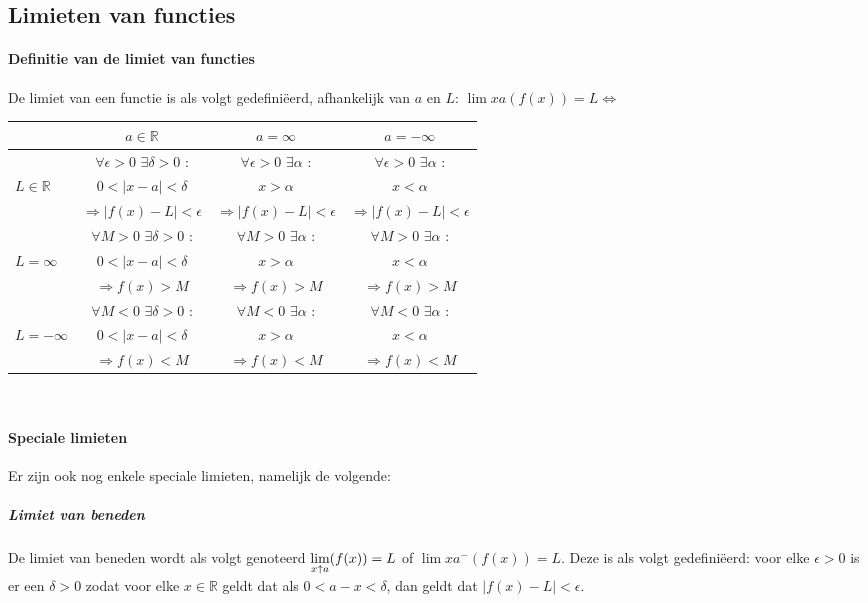 \subsection{Limieten van functies}
\paragraph{Definitie van de limiet van functies} De limiet van een functie is als volgt gedefiniëerd, afhankelijk van $a$ en $L$: $\lim{x}{a}(f(x))=L \Leftrightarrow$

\begin{tabular}{|l|c|c|c|}\hline
		& $a \in \mathbb{R}$ & $a = \infty$ & $a = -\infty$ \\ \hline
		& $\forall \epsilon > 0$ $\exists \delta > 0 $ : & $\forall \epsilon > 0$ $\exists \alpha$ : & $\forall \epsilon > 0$ $\exists \alpha$ :  \\
		$L \in \mathbb{R}$& $0<|x-a|<\delta$ & $x>\alpha$ & $x<\alpha$\\
		& $ \Rightarrow|f(x) - L|<\epsilon$ & $\Rightarrow|f(x) - L|<\epsilon$ & $\Rightarrow|f(x) - L|<\epsilon$ \\ \hline
		& $\forall M>0$ $\exists \delta > 0$ : & $\forall M>0$ $\exists \alpha$ : & $\forall M>0$ $\exists \alpha$ : \\
		$L = \infty$ & $0<|x-a|<\delta$ & $x > \alpha$ & $x < \alpha$ \\
		& $\Rightarrow f(x) > M$ & $\Rightarrow f(x) > M$ & $\Rightarrow f(x) > M$ \\ \hline
		& $\forall M<0$ $\exists \delta > 0$ : & $\forall M<0$ $\exists \alpha$ : & $\forall M<0$ $\exists \alpha$ : \\
		$L = -\infty$ & $0<|x-a|<\delta$ & $x > \alpha$ & $x < \alpha$ \\
		& $\Rightarrow f(x) < M$ & $\Rightarrow f(x) < M$ & $\Rightarrow f(x) < M$ \\\hline
	\end{tabular}\\

\paragraph{Speciale limieten} Er zijn ook nog enkele speciale limieten, namelijk de volgende:

\subparagraph{Limiet van beneden} De limiet van beneden wordt als volgt genoteerd $\underset{x\uparrow a}{\text{lim}}(f(x))=L$ of $\lim{x}{a^{-}}(f(x))=L$. Deze is als volgt gedefiniëerd: voor elke $\epsilon>0$ is er een $\delta>0$ zodat voor elke $x\in\mathbb{R}$ geldt dat als $0<a-x<\delta$, dan geldt dat $|f(x)-L|<\epsilon$.

